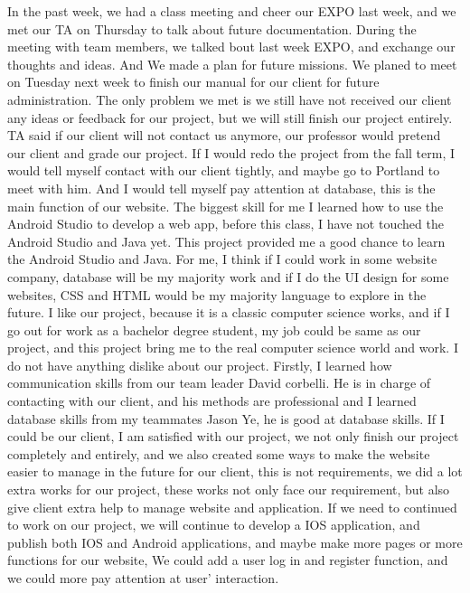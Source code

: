 \documentclass[onecolumn, draftclsnofoot,10pt, compsoc]{IEEEtran}
\begin{document}
In the past week, we had a class meeting and cheer our EXPO last week, and we met our TA on Thursday to talk about future documentation. During the meeting with team members, we talked bout last week EXPO, and exchange our thoughts and ideas. And We made a plan for future missions. We planed to meet on Tuesday next week to finish our manual for our client for future administration. The only problem we met is we still have not received our client any ideas or feedback for our project, but we will still finish our project entirely. TA said if our client will not contact us anymore, our professor would pretend our client and grade our project. If I would redo the project from the fall term, I would tell myself contact with our client tightly, and maybe go to Portland to meet with him. And I would tell myself pay attention at database, this is the main function of our website. The biggest skill for me I learned how to use the Android Studio to develop a web app, before this class, I have not touched the Android Studio and Java yet. This project provided me a good chance to learn the Android Studio and Java. For me, I think if I could work in some website company, database will be my majority work and if I do the UI design for some websites, CSS and HTML would be my majority language to explore in the future. I like our project, because it is a classic computer science works, and if I go out for work as a bachelor degree student, my job could be same as our project, and this project bring me to the real computer science world and work. I do not have anything dislike about our project. Firstly, I learned how communication skills from our team leader David corbelli. He is in charge of contacting with our client, and his methods are professional and I learned database skills from my teammates Jason Ye, he is good at database skills. If I could be our client, I am satisfied with our project, we not only finish our project completely and entirely, and we also created some ways to make the website easier to manage in the future for our client, this is not requirements, we did a lot extra works for our project, these works not only face our requirement, but also give client extra help to manage website and application. If we need to continued to work on our project, we will continue to develop a IOS application, and publish both IOS and Android applications, and maybe make more pages or more functions for our website, We could add a user log in and register function, and we could more pay attention at user’ interaction.\\ \\
\newpage
\end{document}
